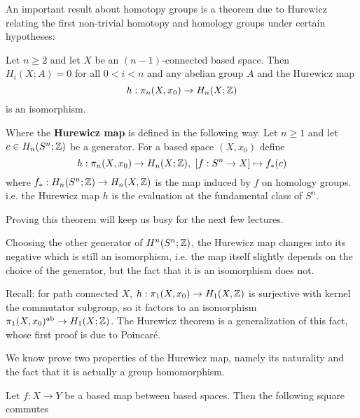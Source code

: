 An important result about homotopy groups is a theorem due to Hurewicz relating the first non-trivial homotopy and homology groups under certain hypotheses:

\begin{theorem}[Hurewicz]\label{theorem:absolute-hurewicz}
Let $n\geq2$ and let $X$ be an $(n-1)$-connected based space. Then $H_i(X;A)=0$ for all $0<i<n$ and any abelian group $A$ and the Hurewicz map
\[h:\pi_n(X,x_0)\to H_n(X;{\mathbb Z})\]
is an isomorphism.
\end{theorem}

Where the \textbf{Hurewicz map} is defined in the following way. Let $n\geq1$ and let $c\in H_n(S^n;{\mathbb Z})$ be a generator. For a based space $(X,x_0)$ define
\[h:\pi_n(X,x_0)\to H_n(X;\Z),\ [f:S^n\to X]\mapsto f_*(c)\]
where $f_*:H_n(S^n;{\mathbb Z})\to H_n(X,{\mathbb Z})$ is the map induced by $f$ on homology groups. i.e. the Hurewicz map $h$ is the evaluation at the fundamental class of $S^n$.

Proving this theorem will keep us busy for the next few lectures.

\begin{remark}
Choosing the other generator of $H^n(S^n;{\mathbb Z})$, the Hurewicz map changes into its negative which is still an isomorphism, i.e. the map itself slightly depends on the choice of the generator, but the fact that it is an isomorphism does not.
\end{remark}

\begin{remark}
Recall: for path connected $X$, $h:\pi_1(X,x_0)\to H_1(X,{\mathbb Z})$ is surjective with kernel the commutator subgroup, so it factors to an isomorphism $\pi_1(X,x_0)^{\text{ab}}\to H_1(X;{\mathbb Z})$. The Hurewicz theorem is a generalization of this fact, whose first proof is due to Poincaré.
\end{remark}

We know prove two properties of the Hurewicz map, namely its naturality and the fact that it is actually a group homomorphism.

 Let $f:X\to Y$ be a based map between based spaces. Then the following square commutes
\begin{center}
\end{center}

